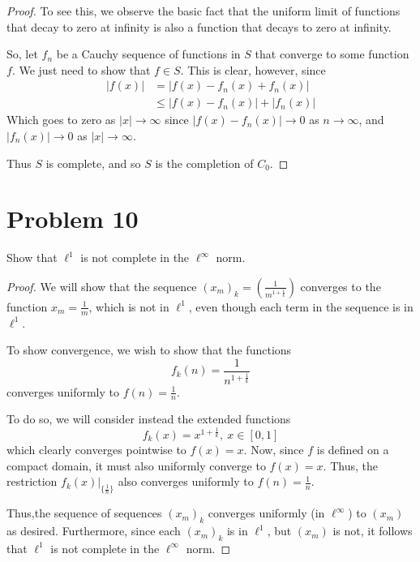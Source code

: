 \documentclass[fontsize=11pt]{scrartcl} %
\numberwithin{equation}{section} %
\numberwithin{figure}{section} %
\numberwithin{table}{section} %
\begin{document}
\begin{proof}
    To see this, we observe the basic fact that the uniform limit of functions
    that decay to zero at infinity is also a function that decays to zero at
    infinity.

    So, let $f_n$ be a Cauchy sequence of functions in $S$ that converge to some
    function $f$. We just need to show that $f\in S$. This is clear, however,
    since 
    \[
        \begin{aligned}
            |f(x)| &= |f(x)-f_n(x)+f_n(x)|\\
                    &\leq |f(x)-f_n(x)| + |f_n(x)|
        \end{aligned}
    \]
    Which goes to zero as $|x|\to\infty$ since $|f(x)-f_n(x)|\to 0$ as $n\to\infty$, and
    $|f_n(x)|\to 0 $ as $|x|\to\infty$.

    Thus $S$ is complete, and so $S$ is the completion of $C_0$. 
\end{proof}
\newpage
\section*{Problem 10}
Show that $\ell^1$ is not complete in the $\ell^{\infty}$ norm.
\\
\begin{proof}
We will show that the sequence $(x_m)_k = (\frac{1}{m^{1+\frac{1}{k}}})$ converges to
the function $x_m = \frac{1}{m}$, which is not in $\ell^1$, even though each term in the
sequence is in $\ell^1$.

To show convergence, we wish to show that the functions
\[
f_k(n) = \frac{1}{n^{1+\frac{1}{k}}} 
\]
converges uniformly to $f(n)=\frac{1}{n}$.

To do so, we will consider instead the extended functions
\[
f_k(x) = x^{1+\frac{1}{k}},\ x\in[0,1]
\]
which clearly converges pointwise to $f(x) = x$. Now, since $f$ is defined on a compact
domain, it must also uniformly converge to $f(x) = x$. Thus, the restriction $f_k(x)|_{\{\frac{1}{n}\}}$
also converges uniformly to $f(n)=\frac{1}{n}$.

Thus,the sequence of sequences $(x_m)_k$ converges uniformly (in $\ell^{\infty}$) to $(x_m)$ as
desired. Furthermore, since each $(x_m)_k$ is in $\ell^1$, but $(x_m)$ is not, it follows that
$\ell^1$ is not complete in the $\ell^{\infty}$ norm.
\end{proof}

\end{document}
